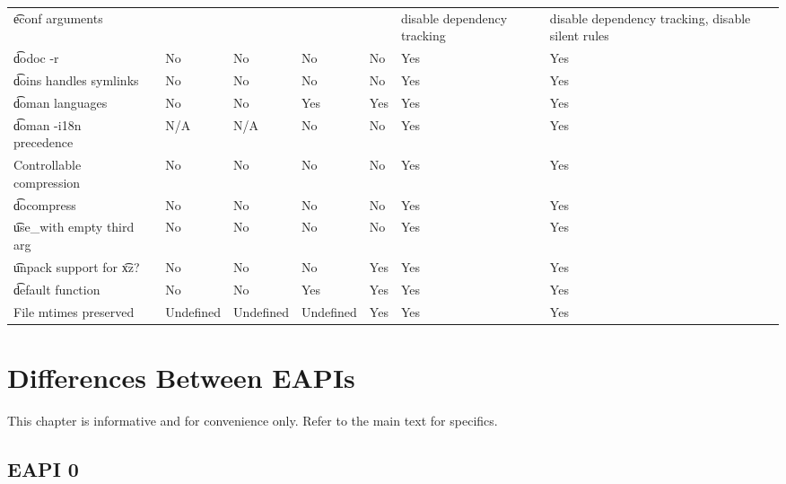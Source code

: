 \begin{landscape}
\begin{longtable}{llP{5em}P{5em}P{6em}P{6em}P{6em}P{6em}}
\t{econf} arguments &  &
    &  &  &  & disable dependency tracking & disable dependency tracking, disable silent rules \\

\t{dodoc -r} &  &
    No & No & No & No & Yes & Yes \\

\t{doins} handles symlinks &  &
    No & No & No & No & Yes & Yes \\

\t{doman} languages &  &
    No & No & Yes & Yes & Yes & Yes \\

\t{doman -i18n} precedence &  &
    N/A & N/A & No & No & Yes & Yes \\

Controllable compression &  &
    No & No & No & No & Yes & Yes \\

\t{docompress} &  &
    No & No & No & No & Yes & Yes \\

\t{use\_with} empty third arg &  &
    No & No & No & No & Yes & Yes \\

\t{unpack} support for \t{xz}? &  &
    No & No & No & Yes & Yes & Yes \\

\t{default} function &  &
    No & No & Yes & Yes & Yes & Yes \\

File mtimes preserved &  &
    Undefined & Undefined & Undefined & Yes & Yes & Yes \\

\end{longtable}
\end{landscape}

\chapter{Differences Between EAPIs}

\note This chapter is informative and for convenience only. Refer to the main text for specifics.

\section*{EAPI 0}

